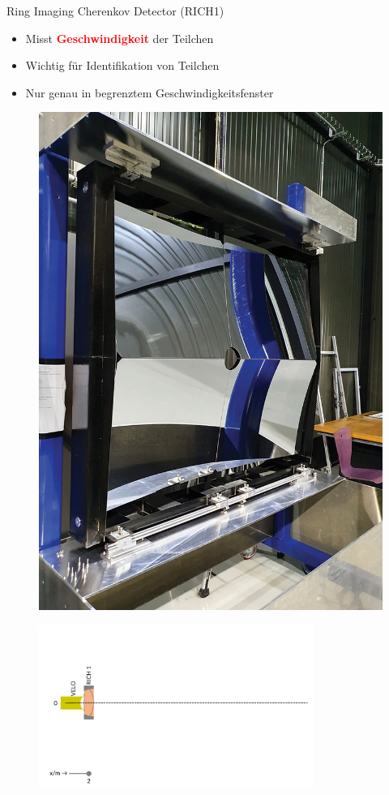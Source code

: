 \begin{frame}{Ring Imaging Cherenkov Detector (RICH1)}
    \begin{minipage}{0.68\textwidth}
    \begin{itemize}
        \item Misst \textcolor{red}{\textbf{Geschwindigkeit}} der Teilchen
        \item Wichtig für Identifikation von Teilchen
        \item Nur genau in begrenztem Geschwindigkeitsfenster
    \end{itemize}
    \end{minipage}\hfill
    \begin{minipage}{0.28\textwidth}
        \begin{figure}[h]
        \centering
        \includegraphics[height=2.5 cm]{Figures Introductory Lecture/LHCb Detector/LHCb_RICH1.jpeg}%
        \end{figure}
    \end{minipage}
    \vspace{-0.5cm}
    \begin{figure}[h]
    \centering
    \includegraphics[width=0.8\textwidth]{Figures Introductory Lecture/LHCb Detector/LHCb_2_DE.png}
    \end{figure}
\end{frame}
